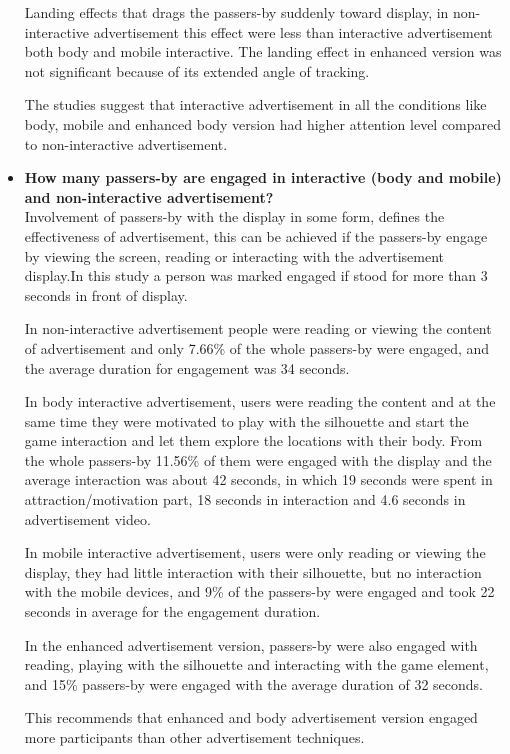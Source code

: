 \begin{itemize}
Landing effects that drags the passers-by suddenly toward display, in non-interactive advertisement this effect were less than interactive advertisement both body and mobile interactive. The landing effect in enhanced version was not significant because of its extended angle of tracking.
\fi


The studies suggest that interactive advertisement in all the conditions like body, mobile and enhanced body version had higher attention level compared to non-interactive advertisement. 

\item \textbf{How many passers-by are engaged in interactive (body and mobile) and non-interactive advertisement?} \\
Involvement of passers-by with the display in some form, defines the effectiveness of advertisement, this can be achieved if the passers-by engage by viewing the screen, reading or interacting with the advertisement display.In this study a person was marked engaged if stood for more than 3 seconds in front of display.

In non-interactive advertisement people were reading or viewing the content of advertisement and only 7.66\% of the whole passers-by were engaged, and the average duration for engagement was 34 seconds.

In body interactive advertisement, users were reading the content and at the same time they were motivated to play with the silhouette and start the game interaction and let them explore the locations with their body. From the whole passers-by 11.56\% of them were engaged with the display and the average interaction was about 42 seconds, in which 19 seconds were spent in attraction/motivation part, 18 seconds in interaction and 4.6 seconds in advertisement video.

In mobile interactive advertisement, users were only reading or viewing the display, they had little interaction with their silhouette, but no interaction with the mobile devices, and 9\% of the passers-by were engaged and took 22 seconds in average for the engagement duration.

In the enhanced advertisement version, passers-by were also engaged with reading, playing with the silhouette and interacting with the game element, and 15\% passers-by were engaged with the average duration of 32 seconds. 

This recommends that enhanced and body advertisement version engaged more participants than other advertisement techniques.




\end{itemize}
